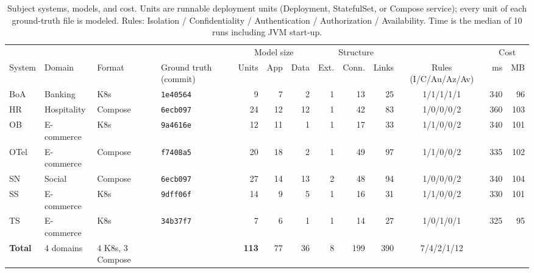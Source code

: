 \documentclass[conference]{IEEEtran}
\begin{document}
\begin{table}[t]
\centering\caption{Subject systems, models, and cost. Units are runnable deployment units (Deployment, StatefulSet, or Compose service); every unit of each ground-truth file is modeled. Rules: Isolation / Confidentiality / Authentication / Authorization / Availability. Time is the median of 10 runs including JVM start-up.}
\label{tab:subjects}\footnotesize\setlength{\tabcolsep}{4pt}
\begin{tabular}{@{}llll rrr rrr c rr@{}}
\toprule
 & & & & \multicolumn{3}{c}{Model size} & \multicolumn{3}{c}{Structure} & & \multicolumn{2}{c}{Cost}\\
\cmidrule(lr){5-7}\cmidrule(lr){8-10}\cmidrule(l){12-13}
System & Domain & Format & Ground truth (commit) & Units & App & Data & Ext. & Conn. & Links & Rules (I/C/Au/Az/Av) & ms & MB\\
\midrule
BoA & Banking & K8s & \texttt{1e40564} & 9 & 7 & 2 & 1 & 13 & 25 & 1/1/1/1/1 & 340 & 96\\
HR & Hospitality & Compose & \texttt{6ecb097} & 24 & 12 & 12 & 1 & 42 & 83 & 1/0/0/0/2 & 360 & 103\\
OB & E-commerce & K8s & \texttt{9a4616e} & 12 & 11 & 1 & 1 & 17 & 33 & 1/1/0/0/2 & 340 & 101\\
OTel & E-commerce & Compose & \texttt{f7408a5} & 20 & 18 & 2 & 1 & 49 & 97 & 1/1/0/0/2 & 335 & 102\\
SN & Social & Compose & \texttt{6ecb097} & 27 & 14 & 13 & 2 & 48 & 94 & 1/0/0/0/2 & 340 & 104\\
SS & E-commerce & K8s & \texttt{9dff06f} & 14 & 9 & 5 & 1 & 16 & 31 & 1/1/0/0/2 & 330 & 101\\
TS & E-commerce & K8s & \texttt{34b37f7} & 7 & 6 & 1 & 1 & 14 & 27 & 1/0/1/0/1 & 325 & 95\\
\midrule
\textbf{Total} & 4 domains & 4 K8s, 3 Compose & & \textbf{113} & 77 & 36 & 8 & 199 & 390 & 7/4/2/1/12 & & \\
\bottomrule\end{tabular}\end{table}
\end{document}
